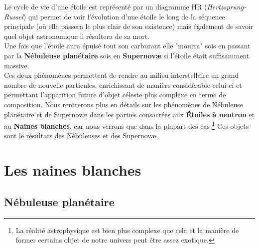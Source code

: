 \documentclass[11pt]{book} %
\begin{document}
Le cycle de vie d'une étoile est représenté par un diagramme HR (\textit{Hertzsprung-Russel}) qui permet de voir l'évolution d'une étoile le long de la séquence principale (où elle passera le plus clair de son existence) mais également de savoir quel objet astronomique il résultera de sa mort.\\
Une fois que l'étoile aura épuisé tout son carburant elle "mourra" sois en passant par la \textbf{Nébuleuse planétaire} sois en \textbf{Supernovæ} si l'étoile était suffisamment massive.\\
Ces deux phénomènes permettent de rendre au milieu interstellaire un grand nombre de nouvelle particules, enrichissant de manière considérable celui-ci et permettant l'apparition future d'objet céleste plus complexe en terme de composition.
\n
Nous rentrerons plus en détails sur les phénomènes de Nébuleuse planétaire et de Supernovæ dans les parties consacrées aux \textbf{Étoiles à neutron} et au \textbf{Naines blanches}, car nous verrons que dans la plupart des cas \footnote{La réalité astrophysique est bien plus complexe que cela et la manière de former certains objet de notre univers peut être assez exotique.} Ces objets sont le résultats des Nébuleuses et des Supernovæ.

\section{Les naines blanches}
\subsection{Nébuleuse planétaire}
\end{document}
